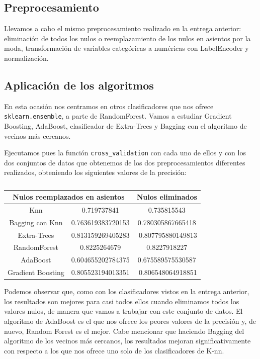 \documentclass[a4paper,11pt]{article}
\begin{document}
\subsection{Preprocesamiento}

Llevamos a cabo el mismo preprocesamiento realizado en la entrega anterior: eliminación de todos los nulos o reemplazamiento de los nulos en asientos por la moda, transformación de variables categóricas a numéricas con LabelEncoder y normalización.

\subsection{Aplicación de los algoritmos}

En esta ocasión nos centramos en otros clasificadores que nos ofrece \texttt{sklearn.ensemble}, a parte de RandomForest. Vamos a estudiar Gradient Boosting, AdaBoost, clasificador de Extra-Trees y Bagging con el algoritmo de vecinos más cercanos. 

Ejecutamos pues la función \texttt{cross_validation} con cada uno de ellos y con los dos conjuntos de datos que obtenemos de los dos preprocesamientos diferentes realizados, obteniendo los siguientes valores de la precisión:

\begin{table}[htbp]
	\caption{}\begin{center}
	\begin{tabular}{|c|c|c|}
		\hline
		\multicolumn{ 2}{|c|}{\textbf{Nulos reemplazados en asientos}} & \textbf{Nulos eliminados} \\ \hline
		Knn & 0.719737841 & 0.735815543 \\ \hline
		Bagging con Knn & 0.763619383720153 & 0.780305867665418 \\ \hline
		Extra-Trees & \multicolumn{1}{r|}{0.813159269405283} & \multicolumn{1}{r|}{0.807795880149813} \\ \hline
		RandomForest & 0.8225264679 & 0.8227918227 \\ \hline
		AdaBoost & 0.604655202784375 & 0.675589575530587 \\ \hline
		Gradient Boosting & 0.805523194013351 & \multicolumn{1}{r|}{0.806548064918851} \\ \hline
	\end{tabular}\end{center}
	\label{}
\end{table}

Podemos observar que, como con los clasificadores vistos en la entrega anterior, los resultados son mejores para casi todos ellos cuando eliminamos todos los valores nulos, de manera que vamos a trabajar con este conjunto de datos. El algoritmo de AdaBoost es el que nos ofrece los peores valores de la precisión y, de nuevo, Random Forest es el mejor. Cabe mencionar que haciendo Bagging del algoritmo de los vecinos más cercanos, los resultados mejoran significativamente con respecto a los que nos ofrece uno solo de los clasificadores de K-nn.
\end{document}
